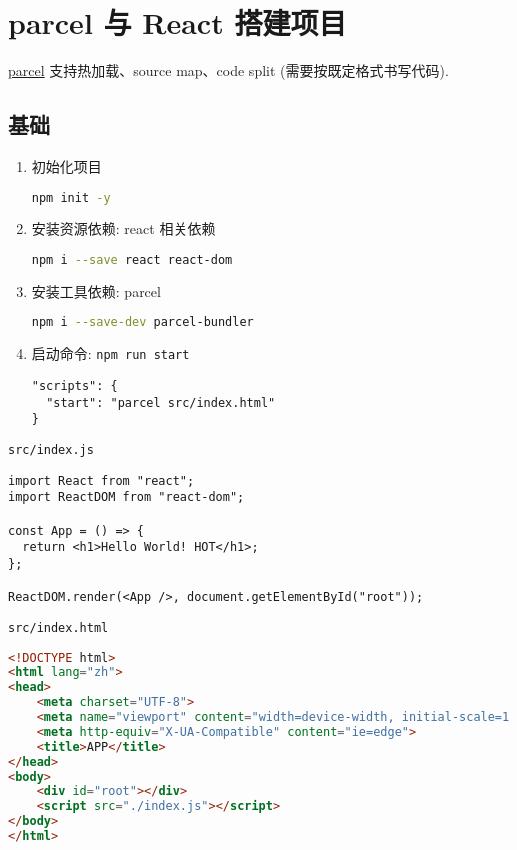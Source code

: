 \section{parcel 与 React
搭建项目}\label{parcel-ux4e0e-react-ux642dux5efaux9879ux76ee}

\href{https://github.com/parcel-bundler/parcel}{parcel}
支持热加载、source map、code split (需要按既定格式书写代码).

\subsection{基础}\label{ux57faux7840}

\begin{enumerate}
\def\labelenumi{\arabic{enumi}.}
\item
  初始化项目

\begin{lstlisting}[language=bash]
npm init -y
\end{lstlisting}
\item
  安装资源依赖: react 相关依赖

\begin{lstlisting}[language=bash]
npm i --save react react-dom
\end{lstlisting}
\item
  安装工具依赖: parcel

\begin{lstlisting}[language=bash]
npm i --save-dev parcel-bundler
\end{lstlisting}
\item
  启动命令: \lstinline!npm run start!

\begin{lstlisting}
"scripts": {
  "start": "parcel src/index.html"
}
\end{lstlisting}
\end{enumerate}

\lstinline!src/index.js!

\begin{lstlisting}
import React from "react";
import ReactDOM from "react-dom";

const App = () => {
  return <h1>Hello World! HOT</h1>;
};

ReactDOM.render(<App />, document.getElementById("root"));
\end{lstlisting}

\lstinline!src/index.html!

\begin{lstlisting}[language=HTML]
<!DOCTYPE html>
<html lang="zh">
<head>
    <meta charset="UTF-8">
    <meta name="viewport" content="width=device-width, initial-scale=1.0">
    <meta http-equiv="X-UA-Compatible" content="ie=edge">
    <title>APP</title>
</head>
<body>
    <div id="root"></div>
    <script src="./index.js"></script>
</body>
</html>
\end{lstlisting}

